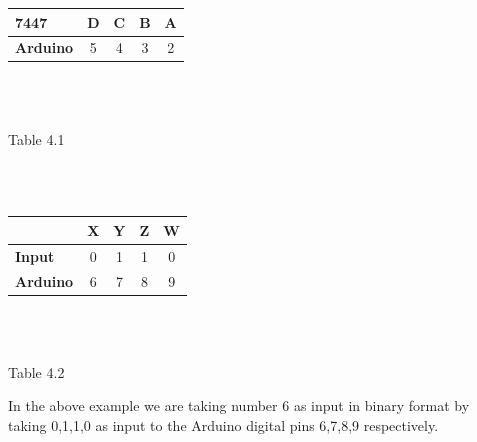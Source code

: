 \documentclass[journal,12pt,twocolumn]{IEEEtran}
\begin{document}
\begin{tabular}{|l|c|c|c|c|}
\hline
\textbf{7447} & D & C & B & A\\

\hline

\textbf{Arduino} & 5 & 4 & 3 & 2\\
\hline
\end{tabular}\\
\
\centerline{Table 4.1}\\
\
\centering
\\\begin{tabular}{|l|c|c|c|c|}
\hline
& X & Y & Z & W\\
\hline
\textbf{Input} & 0 & 1 & 1 & 0\\
\hline
\textbf{Arduino} & 6 & 7 & 8 & 9\\
\hline
\end{tabular}\\
\
\centerline{Table 4.2}
In the above example we are taking number 6 as input in binary format by taking 0,1,1,0 as input to the Arduino digital pins 6,7,8,9 respectively.\\
\
\end{document}
